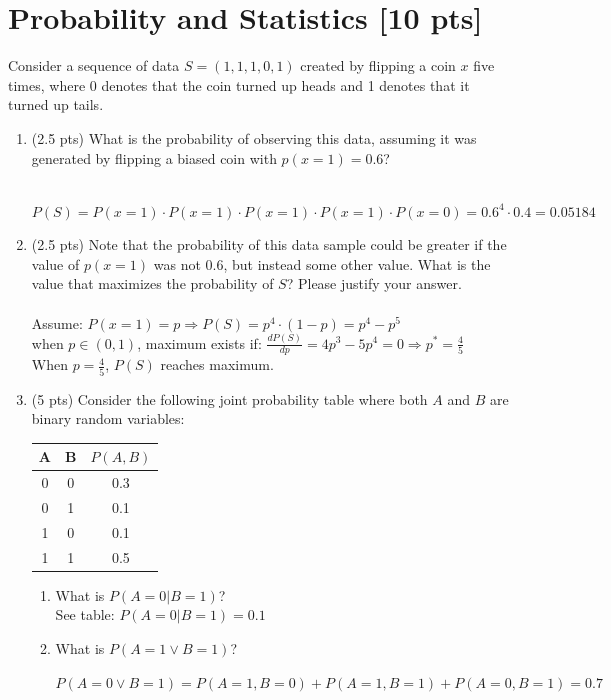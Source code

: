\documentclass[a4paper]{article}
\theoremstyle{definition}
\newenvironment{soln}{
	\leavevmode\color{blue}\ignorespaces
}{}
\begin{document}
	
	
	
	\section{Probability and Statistics [10 pts]}
	Consider a sequence of data $S = (1, 1, 1, 0, 1)$ created by flipping a coin $x$ five times, where 0 denotes that the coin turned up heads and 1 denotes that it turned up tails.
	\begin{enumerate}
		\item 	(2.5 pts) What is the probability of observing this data, assuming it was generated by flipping a biased coin with $p(x=1) = 0.6$?
		
		\begin{soln}
		\\
		$P(S) = P(x=1) \cdot P(x=1) \cdot P(x=1) \cdot P(x=1) \cdot P(x=0) = 0.6^4 \cdot 0.4 = 0.05184$
		\end{soln}
		
		\item 	(2.5 pts) Note that the probability of this data sample could be greater if the value of $p(x = 1)$ was not $0.6$, but instead some other value. What is the value that maximizes the probability of $S$? Please justify your answer.\\
		\begin{soln}\\
		Assume: $P(x=1) = p \Rightarrow P(S) = p^4 \cdot (1-p) = p^4 - p^5$\\
		when $p \in (0,1)$, maximum exists if: $\frac{dP(S)}{dp} = 4p^3 - 5p^4 = 0 \Rightarrow p^* = \frac{4}{5}$\\
		When $p = \frac{4}{5}$, $P(S)$ reaches maximum.
		\end{soln}
		
		\item 	(5 pts) Consider the following joint probability table where both $A$ and $B$ are binary random variables: 
		\begin{table}[htb]
			\centering
			\begin{tabular}{ccc}\hline
				A & B & $P(A, B)$  \\\hline
				0 & 0 & 0.3 \\
				0 & 1 & 0.1 \\
				1 & 0 & 0.1 \\
				1 & 1 & 0.5 \\\hline
			\end{tabular}
		\end{table}
		\begin{enumerate}
			\item 	What is $P(A = 0 | B = 1)$?\\
			 \begin{soln}  See table: $P(A=0 | B=1) = 0.1$ \end{soln}
			 
			\item 	What is $P(A = 1 \vee B = 1 )$?\\
		    \begin{soln}
				$P(A=0 \vee B=1) = P(A=1,B=0) + P(A=1,B=1) + P(A=0,B=1) = 0.7$
			\end{soln}
		\end{enumerate}
	\end{enumerate}
	
\end{document}
